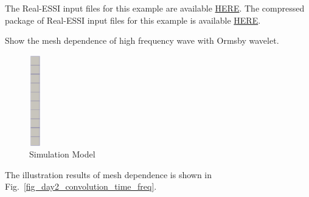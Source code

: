 The Real-ESSI input files for this example are available 
\href{http://sokocalo.engr.ucdavis.edu/~jeremic/lecture_notes_online_material/_Chapter_Short_Course_Examples/Day2/Convolution_Motions}{HERE}. 
The compressed package of Real-ESSI input files for this example is available 
\href{http://sokocalo.engr.ucdavis.edu/~jeremic/lecture_notes_online_material/_Chapter_Short_Course_Examples/Day2/Convolution_Motions/_all_files_packaged_for_Convolution_Motions.tar.gz}{HERE}. 


Show the mesh dependence of high frequency wave with Ormsby wavelet.

\begin{figure}[H]
  \centering
  \includegraphics[width = 0.5cm]{./Figure-files/Day2/Convolution_Motions/overview.png}
  \caption{Simulation Model}
  \label{fig_decon_1D_motion_3D_model4}
\end{figure}

The illustration results of mesh dependence is shown in Fig.~\ref{fig_day2_convolution_time_freq}.

